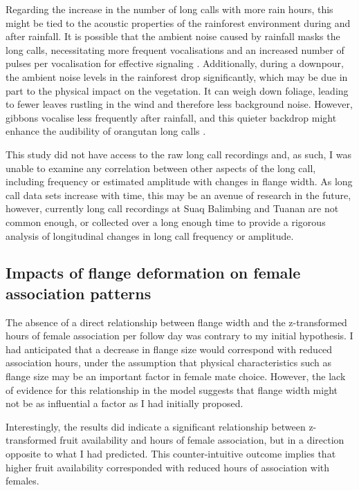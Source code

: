 Regarding the increase in the number of long calls with more rain hours, this might be tied to the acoustic properties of the rainforest environment during and after rainfall. It is possible that the ambient noise caused by rainfall masks the long calls, necessitating more frequent vocalisations and an increased number of pulses per vocalisation for effective signaling \citep{Spillmann.2016}. Additionally, during a downpour, the ambient noise levels in the rainforest drop significantly, which may be due in part to the physical impact on the vegetation. It can weigh down foliage, leading to fewer leaves rustling in the wind and therefore less background noise. However, gibbons vocalise less frequently after rainfall, and this quieter backdrop might enhance the audibility of orangutan long calls \citep{Clink.2020}. 

This study did not have access to the raw long call recordings and, as such, I was unable to examine any correlation between other aspects of the long call, including frequency or estimated amplitude with changes in flange width. As long call data sets increase with time, this may be an avenue of research in the future, however, currently long call recordings at Suaq Balimbing and Tuanan are not common enough, or collected over a long enough time to provide a rigorous analysis of longitudinal changes in long call frequency or amplitude.

\subsection{Impacts of flange deformation on female association patterns}

The absence of a direct relationship between flange width and the z-transformed hours of female association per follow day was contrary to my initial hypothesis. I had anticipated that a decrease in flange size would correspond with reduced association hours, under the assumption that physical characteristics such as flange size may be an important factor in female mate choice. However, the lack of evidence for this relationship in the model suggests that flange width might not be as influential a factor as I had initially proposed.

Interestingly, the results did indicate a significant relationship between z-transformed fruit availability and hours of female association, but in a direction opposite to what I had predicted. This counter-intuitive outcome implies that higher fruit availability corresponded with reduced hours of association with females.

